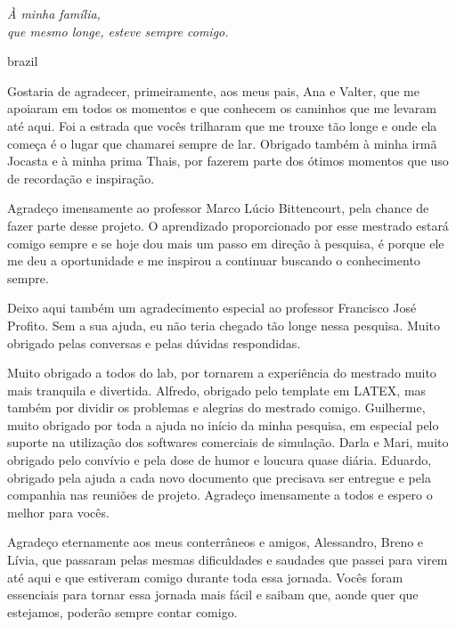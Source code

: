 

\begin{dedicatoria}
    \vspace*{\fill}
    \centering
    \noindent
    \textit{À minha família,\\
    	    que mesmo longe, esteve sempre comigo. }
    \vspace*{\fill}
\end{dedicatoria}

\begin{otherlanguage*}{brazil}
\begin{agradecimentos}
Gostaria de agradecer, primeiramente, aos meus pais, Ana e Valter, que me apoiaram em todos os momentos e que conhecem os caminhos que me levaram até aqui. Foi a estrada que vocês trilharam que me trouxe tão longe e onde ela começa é o lugar que chamarei sempre de lar. Obrigado também à minha irmã Jocasta e à minha prima Thais, por fazerem parte dos ótimos momentos que uso de recordação e inspiração. 

Agradeço imensamente ao professor Marco Lúcio Bittencourt, pela chance de fazer parte desse projeto. O aprendizado proporcionado por esse mestrado estará comigo sempre e se hoje dou mais um passo em direção à pesquisa, é porque ele me deu a oportunidade e me inspirou a continuar buscando o conhecimento sempre.

Deixo aqui também um agradecimento especial ao professor Francisco José Profito. Sem a sua ajuda, eu não teria chegado tão longe nessa pesquisa. Muito obrigado pelas conversas e pelas dúvidas respondidas.  

Muito obrigado a todos do lab, por tornarem a experiência do mestrado muito mais tranquila e divertida. Alfredo, obrigado pelo template em LATEX, mas também por dividir os problemas e alegrias do mestrado comigo. Guilherme, muito obrigado por toda a ajuda no início da minha pesquisa, em especial pelo suporte na utilização dos softwares comerciais de simulação. Darla e Mari, muito obrigado pelo convívio e pela dose de humor e loucura quase diária. Eduardo, obrigado pela ajuda a cada novo documento que precisava ser entregue e pela companhia nas reuniões de projeto. Agradeço imensamente a todos e espero o melhor para vocês.

Agradeço eternamente aos meus conterrâneos e amigos, Alessandro, Breno e Lívia, que passaram pelas mesmas dificuldades e saudades que passei para virem até aqui e que estiveram comigo durante toda essa jornada. Vocês foram essenciais para tornar essa jornada mais fácil e saibam que, aonde quer que estejamos, poderão sempre contar comigo.     


\end{agradecimentos}
\end{otherlanguage*}
